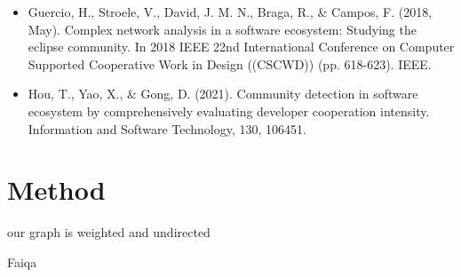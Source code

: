 \documentclass{article}
\begin{document}
\begin{itemize}
{\begin{itemize}
\item Guercio, H., Stroele, V., David, J. M. N., Braga, R., \& Campos, F. (2018, May). Complex network analysis in a software ecosystem: Studying the eclipse community. In 2018 IEEE 22nd International Conference on Computer Supported Cooperative Work in Design ((CSCWD)) (pp. 618-623). IEEE.

\item Hou, T., Yao, X., & Gong, D. (2021). Community detection in software ecosystem by comprehensively evaluating developer cooperation intensity. Information and Software Technology, 130, 106451.

\end{itemize}





\section{Method}

our graph is weighted and undirected 

Faiqa
}
\end{itemize}
\end{document}
